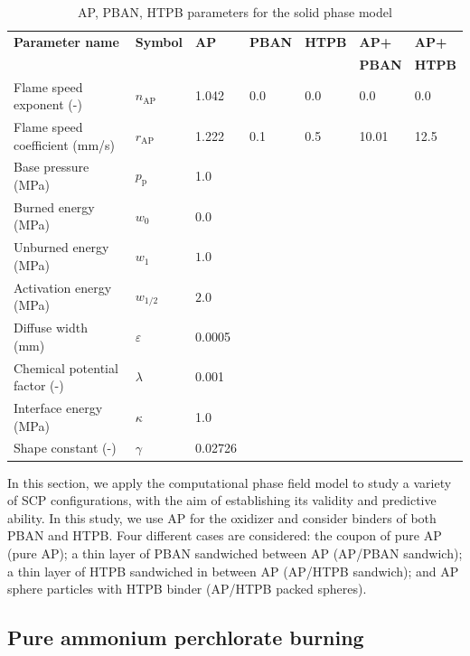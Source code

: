 \documentclass[colorinlistoftodos,review]{elsarticle}
\begin{document}
\begin{table} 
  \centering
  \begin{tabularx}{\linewidth}{llXXXXX} 
    \toprule
    \bf Parameter name & \bf Symbol & \bf AP & \bf PBAN & \bf HTPB & \bf AP+ & \bf AP+\\
    \bf                & \bf        & \bf    & \bf      & \bf      & \bf PBAN & \bf HTPB\\
    \midrule
    Flame speed exponent (-)      & $n_\mathrm{AP}$ &  1.042 & 0.0 & 0.0 & 0.0 & 0.0\\ 
    Flame speed coefficient (mm/s)& $r_\mathrm{AP}$ &  1.222 & 0.1 & 0.5 & 10.01 & 12.5 \\
    Base pressure (MPa)           & $p_\mathrm{p}$   &  1.0 \\ 
    Burned energy (MPa)           & $w_0$   & $0.0$\\
    Unburned energy (MPa)         & $w_1$   & $1.0$ \\
    Activation energy (MPa)       & $w_{1/2}$ & $2.0$ \\
    Diffuse width (mm)            & $\varepsilon$ & 0.0005 \\
    Chemical potential factor (-) & $\lambda$ & 0.001 \\
    Interface energy (MPa)        & $\kappa$ & 1.0 \\
    Shape constant (-)            & $\gamma$ & 0.02726\\
    \bottomrule
  \end{tabularx}
  \caption{AP, PBAN, HTPB parameters for the solid phase model}
  \label{tab:parameters} 
\end{table}


In this section, we apply the computational phase field model to study a variety of SCP configurations, with the aim of establishing its validity and predictive ability.
In this study, we use AP for the oxidizer and consider binders of both PBAN and HTPB.
Four different cases are considered: the coupon of pure AP (pure AP); a thin layer of PBAN sandwiched between AP (AP\slash PBAN sandwich); a thin layer of HTPB sandwiched in between AP (AP\slash HTPB sandwich); and AP sphere particles with HTPB binder (AP\slash HTPB packed spheres).

\subsection{Pure ammonium perchlorate burning}
\end{document}
